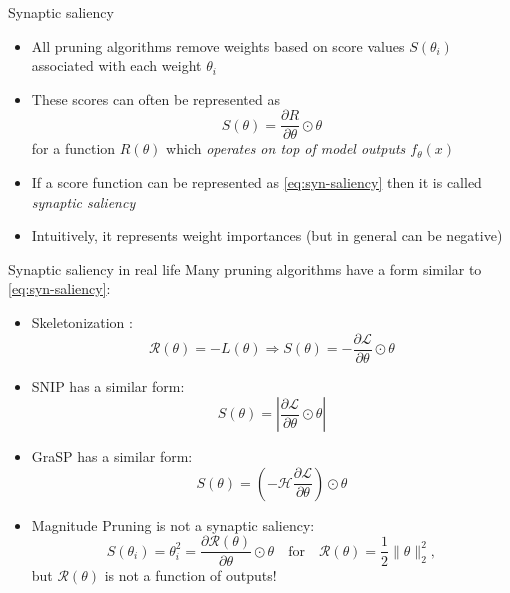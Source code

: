 \documentclass[10pt, handout]{beamer}
\begin{document}
\begin{frame}{Synaptic saliency}
\begin{itemize}
    \pause\item All pruning algorithms remove weights based on score values $S(\theta_i)$ associated with each weight $\theta_i$
    \pause\item These scores can often be represented as
\begin{equation}\label{eq:syn-saliency}
    S(\theta)=\frac{\partial R}{\partial \theta} \odot \theta
\end{equation}
for a function $R(\theta)$ which \textit{operates on top of model outputs $f_\theta(x)$}
    \pause\item If a score function can be represented as \eqref{eq:syn-saliency} then it is called \textit{synaptic saliency} \cite{SynFlow}
    \pause\item Intuitively, it represents weight importances (but in general can be negative)
\end{itemize}
\end{frame}


\begin{frame}{Synaptic saliency in real life}
\pause Many pruning algorithms have a form similar to \eqref{eq:syn-saliency}:
\begin{itemize}
    \pause\item Skeletonization \cite{Skeletonization}:
    \begin{equation}
        \mathcal{R}(\theta) = -L(\theta) \Longrightarrow S(\theta)= -\frac{\partial \mathcal{L}}{\partial \theta} \odot \theta
    \end{equation}
    
    \pause\item SNIP \cite{SNIP} has a similar form:
    \begin{equation}
        S(\theta) = \left| \frac{\partial \mathcal{L}}{\partial \theta} \odot \theta \right|
    \end{equation}
    
    \pause\item GraSP \cite{GraSP} has a similar form:
    \begin{equation}
        S(\theta) = \left(- \mathcal{H}\frac{\partial \mathcal{L}}{\partial \theta} \right) \odot \theta
    \end{equation}
    
    \pause\item Magnitude Pruning is not a synaptic saliency:
    \begin{equation}
        S(\theta_i) = \theta_i^2 = \frac{\partial \mathcal{R}(\theta)}{\partial \theta} \odot\theta \quad\text{for}\quad \mathcal{R}(\theta) = \frac{1}{2}\| \theta \|_2^2,
    \end{equation}
    but $\mathcal{R}(\theta)$ is not a function of outputs!
\end{itemize}
\end{frame}
\end{document}
